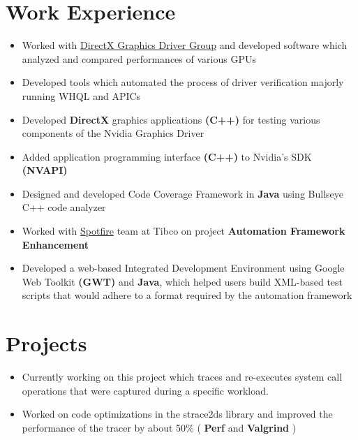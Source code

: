 \documentclass[10pt,a4paper,sans]{moderncv}        %
\begin{document}
{\section{Work Experience}
\vspace{3pt}
{}
	\begin{itemize}
    	\item{Worked with \uline{DirectX Graphics Driver Group} and developed software which analyzed and compared performances of various GPUs}
        \item{Developed tools which automated the process of driver verification majorly running WHQL and APICs}
        \item{Developed \textbf{DirectX} graphics applications \textbf{(C++)} for testing various components of the Nvidia Graphics Driver}
        \item{Added application programming interface \textbf{(C++)} to Nvidia’s SDK \textbf{(NVAPI)}}
        \item{Designed and developed Code Coverage Framework in \textbf{Java} using Bullseye C++ code analyzer}
    \end{itemize}

\vspace{3pt}
{}
	\begin{itemize}
    	\item{Worked with \uline{Spotfire} team at Tibco on project \textbf{Automation Framework Enhancement}}
        \item{Developed a web-based Integrated Development Environment using Google Web Toolkit \textbf{(GWT)} and \textbf{Java}, which helped users build XML-based test scripts that would adhere to a format required by the automation framework}
\end{itemize}

\vspace{3pt}
\section{Projects}

\vspace{3pt}

\vspace{2pt}
\begin{itemize}
\item \small{Currently working on this project which traces and re-executes system call operations that were captured during a specific workload.}
\item \small{Worked on code optimizations in the strace2ds library and improved the performance of the tracer by about 50\% ( \textbf{Perf} and \textbf{Valgrind} )}
\end{itemize}
\vspace{3pt}

}
\end{document}
